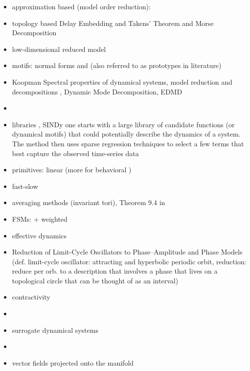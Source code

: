 \documentclass{article}
\theoremstyle{definition} \newtheorem{definition}{Definition}  \newtheorem{example}{Example}
\theoremstyle{remark} \newtheorem{remark}{Remark}
\newcounter{ct}
\begin{document}
\begin{itemize}
\item approximation based (model order reduction): \citep{schilders2008model}
\item topology based Delay Embedding and Takens' Theorem  and Morse Decomposition 
\item low-dimensional reduced model \citep{zemlianova2024dynamical} \citep{nonnenmacher2017extracting}
\item motifs: normal forms \citep{full1999templates} \citep{nayfeh2011normalforms} and \citep{bonilla2012discriminative} (also referred to as prototypes in literature)
\item Koopman  Spectral properties of dynamical systems, model reduction and decompositions \citep{mezic2005spectral}, Dynamic Mode Decomposition\citep{rowley2009spectral}, EDMD \citep{mezic2005spectral}
\item \citep{rowley2017model}
\item libraries \citep{brunton2014compressive}, SINDy  one starts with a large library of candidate functions (or dynamical motifs) that could potentially describe the dynamics of a system. The method then uses sparse regression techniques to select a few terms that best capture the observed time-series data \citep{brunton2016discovering, brunton2016sparse, fasel2022ensemble}
\item  primitives: linear \citep{kaul2020linear} (more for behavioral \citep{ijspeert2013dynamical})
\item fast-slow \citep{jones1995gspt} \citep{verhulst2006methods}  \citep{dsilva2016data} \citep{haller2017exact}
\item averaging methods \citep{sanders2007averaging} (invariant tori\citep{novaes2024invariant}), Theorem 9.4 in \citep{hoppensteadt2012weakly}
\item FSMs: \citep{giles1991extracting, casey1996dynamics, giles1999equivalence, oliva2019fsm, ceni2020excitable, cotteret2024fsm, aichernig2024learning} + weighted\citep{wei2024weighted}
\item effective dynamics \citep{menier2025interpretable}
\item Reduction of Limit-Cycle Oscillators to Phase–Amplitude and Phase Models \citep{ashwin2016mathematical} (def. limit-cycle oscillator: attracting and hyperbolic periodic orbit, reduction: reduce per orb. to a description that involves a phase that lives on a topological circle that can be thought of as an interval)
\item contractivity \citep{lohmiller1998contraction}\citep{bullo2023contraction} \citep{revay2020contracting} \citep{tsukamoto2021contraction} \citep{davydov2022rnn, davydov2024noneuclidean}
\item \citep{li2021novel}
\item surrogate dynamical systems
\item \citep{otto2023learning}
\item vector fields projected onto the manifold \citep{roy2021extracting, luo2023noncanonical}
\end{itemize}
\end{document}
